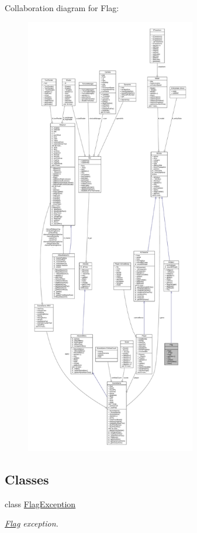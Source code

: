 Collaboration diagram for Flag\+:
\nopagebreak
\begin{figure}[H]
\begin{center}
\leavevmode
\includegraphics[height=550pt]{class_flag__coll__graph}
\end{center}
\end{figure}
\subsection*{Classes}
\begin{DoxyCompactItemize}
\item 
class \hyperlink{class_flag_1_1_flag_exception}{Flag\+Exception}
\begin{DoxyCompactList}\small\item\em \hyperlink{class_flag}{Flag} exception. \end{DoxyCompactList}\end{DoxyCompactItemize}
